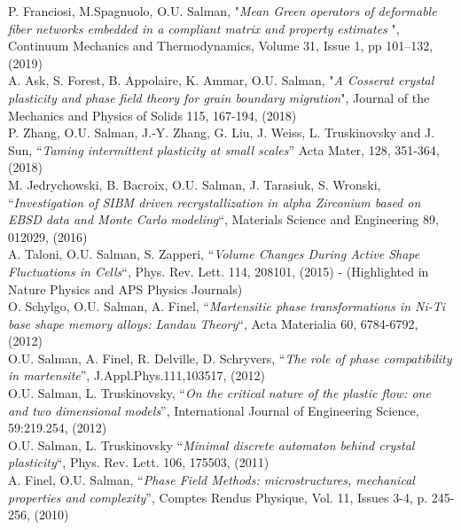 \documentclass[paper=a4,fontsize=11pt]{temp} %
\begin{document}
P. Franciosi, M.Spagnuolo, O.U. Salman, "\textit{Mean Green operators of deformable fiber networks embedded in a compliant matrix and property estimates}
", Continuum Mechanics and Thermodynamics, Volume 31, Issue 1, pp 101–132, (2019) \\

A. Ask, S. Forest, B. Appolaire, K. Ammar, O.U. Salman, "\textit{A Cosserat crystal plasticity and phase field theory for grain boundary migration}", Journal of the Mechanics and Physics of Solids 115, 167-194, (2018)\\

P. Zhang, O.U. Salman, J.-Y. Zhang, G. Liu, J. Weiss, L. Truskinovsky and J. Sun, “\textit{Taming intermittent plasticity at small scales}” Acta Mater, 128, 351-364, (2018)\\

M. Jedrychowski, B. Bacroix, O.U. Salman, J. Tarasiuk, S. Wronski, “\textit{Investigation of SIBM driven recrystallization in alpha Zirconium based on EBSD data and Monte Carlo modeling}“,  Materials Science and Engineering 89, 012029,  (2016)\\

A. Taloni, O.U. Salman, S. Zapperi, “\textit{Volume Changes During Active Shape Fluctuations in Cells}“,  Phys. Rev. Lett. 114, 208101, (2015) - (Highlighted in Nature Physics and APS Physics Journals)\\


O. Schylgo, O.U. Salman, A. Finel, “\textit{Martensitic phase transformations in Ni-Ti base shape memory alloys: Landau Theory}“, Acta Materialia 60, 6784-6792, (2012)\\


O.U. Salman, A. Finel, R. Delville, D. Schryvers, “\textit{The role of phase compatibility in martensite}”, J.Appl.Phys.111,103517, (2012)\\

O.U. Salman, L. Truskinovsky, “\textit{On the critical nature of the plastic flow: one and two dimensional models}”, International Journal of Engineering Science, 59:219.254, (2012)\\

O.U. Salman, L. Truskinovsky “\textit{Minimal discrete automaton behind crystal plasticity}“,  Phys. Rev. Lett. 106, 175503, (2011)\\

A. Finel, O.U. Salman, “\textit{Phase Field Methods: microstructures, mechanical properties and complexity}”, Comptes Rendus Physique, Vol. 11, Issues 3-4, p. 245-256, (2010) \\
\end{document}

